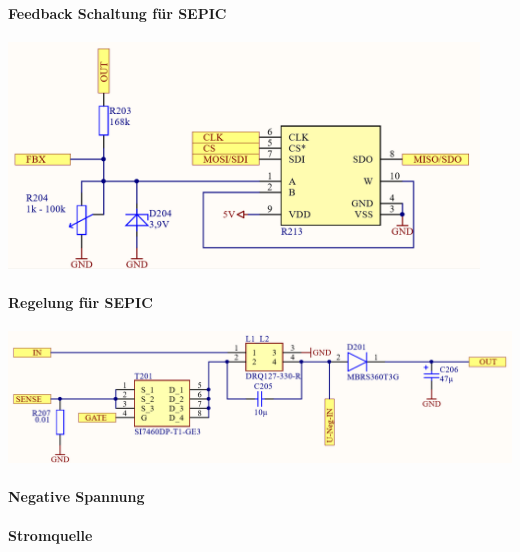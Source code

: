 \documentclass[paper=a4, 12pt]{scrreprt}
\begin{document}
			\paragraph{Feedback Schaltung für SEPIC}
			\begin{adjustbox}{center,caption={},label={fig:},nofloat=figure,vspace=\bigskipamount}
				\includegraphics[height=6cm]{img/Feedback_SEPIC.PNG}
			\end{adjustbox}
			\paragraph{Regelung für SEPIC}
			\begin{adjustbox}{center,caption={},label={fig:},nofloat=figure,vspace=\bigskipamount}
				\includegraphics[width=\textwidth]{img/Regelung_SEPIC.PNG}
			\end{adjustbox}
			\paragraph{Negative Spannung}
			\paragraph{Stromquelle}
			
			
\end{document}
